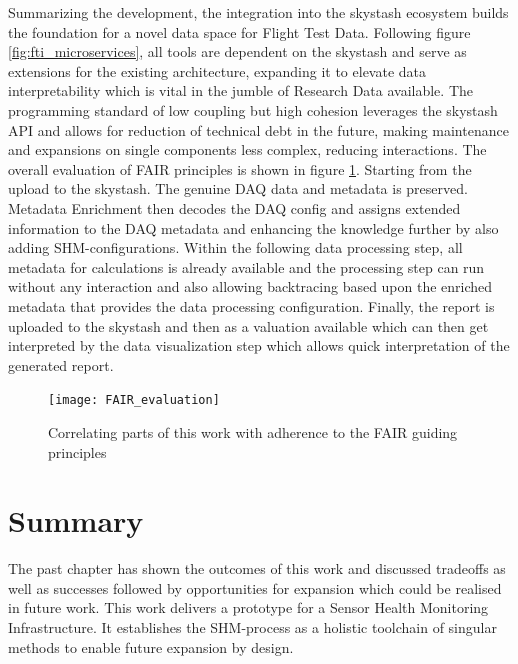Summarizing the development, the integration into the skystash ecosystem builds the foundation for a novel data space for Flight Test Data. Following figure \ref{fig:fti_microservices}, all tools are dependent on the skystash and serve as extensions for the existing architecture, expanding it to elevate data interpretability which is vital in the jumble of Research Data available. The programming standard of low coupling but high cohesion \cite{stevens_structured_1974} leverages the skystash API and allows for reduction of technical debt in the future, making maintenance and expansions on single components less complex, reducing interactions.
The overall evaluation of FAIR principles is shown in figure \ref{fig:FAIR_evaluation}. Starting from the upload to the skystash. The genuine DAQ data and metadata is preserved. Metadata Enrichment then decodes the DAQ config and assigns extended information to the DAQ metadata and enhancing the knowledge further by also adding SHM-configurations. Within the following data processing step, all metadata for calculations is already available and the processing step can run without any interaction and also allowing backtracing based upon the enriched metadata that provides the data processing configuration. Finally, the report is uploaded to the skystash and then as a valuation available which can then get interpreted by the data visualization step which allows quick interpretation of the generated report.


\begin{figure}
    \centering
    \texttt{[image: FAIR\_evaluation]}
    \caption{Correlating parts of this work with adherence to the FAIR guiding principles}
    \label{fig:FAIR_evaluation}
\end{figure}

\section{Summary}
The past chapter has shown the outcomes of this work and discussed tradeoffs as well as successes followed by opportunities for expansion which could be realised in future work.
This work delivers a prototype for a Sensor Health Monitoring Infrastructure. It establishes the SHM-process as a holistic toolchain of singular methods to enable future expansion by design.



